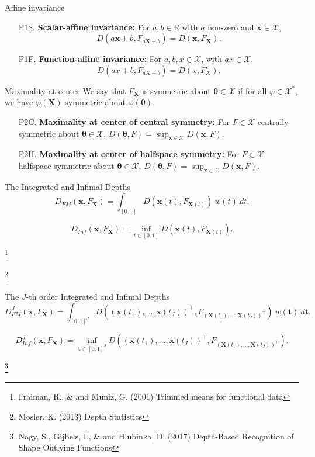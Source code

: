 \documentclass[handout, notes]{beamer}
\newcommand{\R}{\mathbb{R}}
\newcommand{\vx}{\bm{x}}
\newcommand{\vX}{\bm{X}}
\newcommand{\vth}{\bm{\theta}}
\newcommand\blfootnote[1]{%
  \begingroup
  \renewcommand\thefootnote{}\footnote{#1}%
  \addtocounter{footnote}{-1}%
  \endgroup
}
\begin{document}
    \begin{frame}{Affine invariance}
        \begin{enumerate}
            \item[P1S.] \textbf{Scalar-affine invariance:} For $a, b \in \R$
            with $a$ non-zero and $\vx \in \mathscr{X}$, \[
                D(a\vx + b, F_{a\vX + b}) = D(\vx, F_{\vX}).
            \]
            \item[P1F.] \textbf{Function-affine invariance:} For $a, b, x \in
            \mathscr{X}$, with $ax \in \mathscr{X}$, \[
                D(ax + b, F_{aX + b}) = D(x, F_{X}).
            \]
        \end{enumerate}
    \end{frame}

    \begin{frame}{Maximality at center}
        We say that $F_{\vX}$ is symmetric about $\vth \in \mathscr{X}$ if for
        all $\varphi \in \mathscr{X}^*$, we have $\varphi(\vX)$ symmetric
        about $\varphi(\vth)$.

        \begin{enumerate}
            \item[P2C.] \textbf{Maximality at center of central symmetry:} For
            $F \in \mathscr{X}$ centrally symmetric about $\vth \in
            \mathscr{X}$, $D(\vth, F) = \sup_{\vx \in \mathscr{X}} D(\vx, F)$.

            \item[P2H.] \textbf{Maximality at center of halfspace symmetry:} For
            $F \in \mathscr{X}$ halfspace symmetric about $\vth \in
            \mathscr{X}$, $D(\vth, F) = \sup_{\vx \in \mathscr{X}} D(\vx, F)$.
        \end{enumerate}
    \end{frame}

    \begin{frame}{The Integrated and Infimal Depths}
        \[
            D_{FM}(\vx, F_{\vX}) = \int_{[0, 1]} D(\vx(t), F_{\vX(t)})\:w(t)\:dt.
        \]

        \[
            D_{Inf}(\vx, F_{\vX}) = \inf_{t \in [0, 1]} D(\vx(t), F_{\vX(t)}).
        \]

        \blfootnote{
            Fraiman, R., \& and Muniz, G. (2001) Trimmed means for functional
            data
        }
        \blfootnote{
            Mosler, K. (2013) Depth Statistics
        }
    \end{frame}

    \begin{frame}{The $J$-th order Integrated and Infimal Depths}
        \[
            D_{FM}^J(\vx, F_{\vX}) = \int_{[0, 1]^J} D((\vx(t_1), \dots, \vx(t_J))^\top, F_{(\vX(t_1), \dots, \vX(t_J))^\top})\:w(\bm{t})\:d\bm{t}.
        \]

        \[
            D_{Inf}^J(\vx, F_{\vX}) = \inf_{\bm{t} \in [0, 1]^J} D((\vx(t_1), \dots, \vx(t_J))^\top, F_{(\vX(t_1), \dots, \vX(t_J))^\top}).
        \]

        \blfootnote{
            Nagy, S., Gijbels, I., \& and Hlubinka, D. (2017) Depth-Based
            Recognition of Shape Outlying Functions
        }
    \end{frame}
\end{document}
